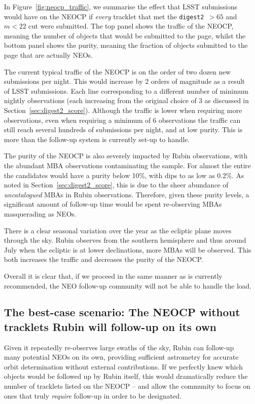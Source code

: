 \documentclass[twocolumn]{aastex631}
\newcommand{\dig}{\texttt{digest2}}
\begin{document}
In Figure~\ref{fig:neocp_traffic}, we summarise the effect that LSST submissions would have on the NEOCP if \textit{every} tracklet that met the \dig{}~$>65$ and $m < 22$ cut were submitted. The top panel shows the traffic of the NEOCP, meaning the number of objects that would be submitted to the page, whilst the bottom panel shows the purity, meaning the fraction of objects submitted to the page that are actually NEOs.

The current typical traffic of the NEOCP is on the order of two dozen new submissions per night. This would increase by 2 orders of magnitude as a result of LSST submissions. Each line corresponding to a different number of minimum nightly observations (each increasing from the original choice of 3 as discussed in Section~\ref{sec:digest2_score}). Although the traffic is lower when requiring more observations, even when requiring a minimum of 6 observations the traffic can still reach several hundreds of submissions per night, and at low purity. This is more than the follow-up system is currently set-up to handle.

The purity of the NEOCP is also severely impacted by Rubin observations, with the abundant MBA observations contaminating the sample. For almost the entire the candidates would have a purity below 10\%, with dips to as low as 0.2\%. As noted in Section~\ref{sec:digest2_score}, this is due to the sheer abundance of \emph{uncatalogued} MBAs in Rubin observations. Therefore, given these purity levels, a significant amount of follow-up time would be spent re-observing MBAs masquerading as NEOs.

There is a clear seasonal variation over the year as the ecliptic plane moves through the sky. Rubin observes from the southern hemisphere and thus around July when the ecliptic is at lower declinations, more MBAs will be observed. This both increases the traffic and decreases the purity of the NEOCP.

Overall it is clear that, if we proceed in the same manner as is currently recommended, the NEO follow-up community will not be able to handle the load.

\subsection{The best-case scenario: The NEOCP without tracklets Rubin will follow-up on its own}\label{sec:no_LSST_detections}

Given it repeatedly re-observes large swaths of the sky, Rubin can follow-up many potential NEOs on its own, providing sufficient astrometry for accurate orbit determination without external contributions. If we perfectly knew which objects would be followed up by Rubin itself, this would dramatically reduce the number of tracklets listed on the NEOCP -- and allow the community to focus on ones that truly \emph{require} follow-up in order to be designated.
\end{document}
